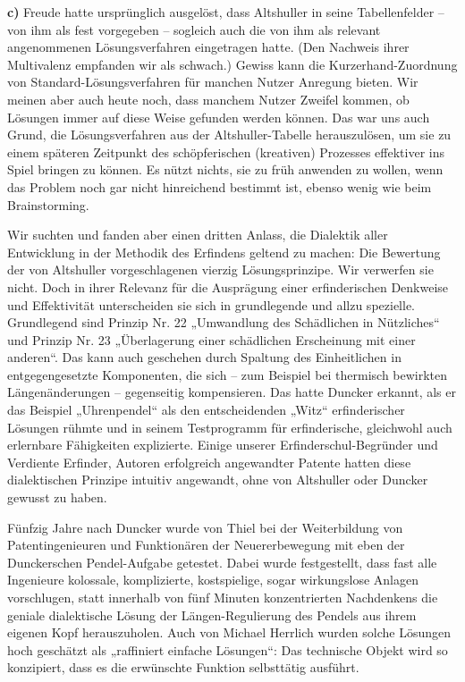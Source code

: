 \documentclass[12pt,a4paper]{article}
\begin{document}
\textbf{c)} 
Freude hatte ursprünglich ausgelöst, dass Altshuller in seine Tabellenfelder –
von ihm als fest vorgegeben -- sogleich auch die von ihm als relevant
angenommenen Lösungsverfahren eingetragen hatte. (Den Nachweis ihrer
Multivalenz empfanden wir als schwach.) Gewiss kann die Kurzerhand-Zuordnung
von Standard-Lösungsverfahren für manchen Nutzer Anregung bieten. Wir meinen
aber auch heute noch, dass manchem Nutzer Zweifel kommen, ob Lösungen immer auf
diese Weise gefunden werden können. Das war uns auch Grund, die
Lösungsverfahren aus der Altshuller-Tabelle herauszulösen, um sie zu einem
späteren Zeitpunkt des schöpferischen (kreativen) Prozesses effektiver ins
Spiel bringen zu können. Es nützt nichts, sie zu früh anwenden zu wollen, wenn
das Problem noch gar nicht hinreichend bestimmt ist, ebenso wenig wie beim
Brainstorming.
\enlargethispage{-2em}

Wir suchten und fanden aber einen dritten Anlass, die Dialektik aller
Entwicklung in der Methodik des Erfindens geltend zu machen: Die Bewertung der
von Altshuller vorgeschlagenen vierzig Lösungsprinzipe. Wir verwerfen sie
nicht.  Doch in ihrer Relevanz für die Ausprägung einer erfinderischen
Denkweise und Effektivität unterscheiden sie sich in grundlegende und allzu
spezielle.  Grundlegend sind Prinzip Nr. 22 „Umwandlung des Schädlichen in
Nützliches“ und Prinzip Nr. 23 „Überlagerung einer schädlichen Erscheinung mit
einer anderen“. Das kann auch geschehen durch Spaltung des Einheitlichen in
entgegengesetzte Komponenten, die sich – zum Beispiel bei thermisch bewirkten
Längenänderungen -- gegenseitig kompensieren. Das hatte Duncker erkannt, als er
das Beispiel „Uhrenpendel“ als den entscheidenden „Witz“ erfinderischer
Lösungen rühmte und in seinem Testprogramm für erfinderische, gleichwohl auch
erlernbare Fähigkeiten explizierte. Einige unserer Erfinderschul-Begründer und
Verdiente Erfinder, Autoren erfolgreich angewandter Patente hatten diese
dialektischen Prinzipe intuitiv angewandt, ohne von Altshuller oder Duncker
gewusst zu haben.

Fünfzig Jahre nach Duncker wurde von Thiel bei der Weiterbildung von
Patentingenieuren und Funktionären der Neuererbewegung mit eben der
Dunckerschen Pendel-Aufgabe getestet. Dabei wurde festgestellt, dass fast alle
Ingenieure kolossale, komplizierte, kostspielige, sogar wirkungslose Anlagen
vorschlugen, statt innerhalb von fünf Minuten konzentrierten Nachdenkens die
geniale dialektische Lösung der Längen-Regulierung des Pendels aus ihrem
eigenen Kopf herauszuholen. Auch von Michael Herrlich wurden solche Lösungen
hoch geschätzt als „raffiniert einfache Lösungen“: Das technische Objekt wird
so konzipiert, dass es die erwünschte Funktion selbsttätig ausführt.
\end{document}

